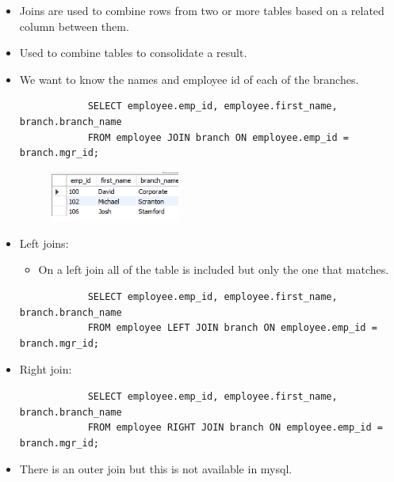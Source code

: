\begin{itemize}
    \item Joins are used to combine rows from two or more tables based on a related column between them.
    \item Used to combine tables to consolidate a result.
    
    \item We want to know the names and employee id of each of the branches.
        \begin{verbatim}
            SELECT employee.emp_id, employee.first_name, branch.branch_name 
            FROM employee JOIN branch ON employee.emp_id = branch.mgr_id;
        \end{verbatim}
        \begin{figure}[H]
            \centering
            \includegraphics[width=0.4\textwidth]{./figs/JOINS.png}
        \end{figure}
    
    \item Left joins:
        \begin{itemize}
            \item On a left join all of the table is included but only the one that matches.
        \end{itemize}
        \begin{verbatim}
            SELECT employee.emp_id, employee.first_name, branch.branch_name 
            FROM employee LEFT JOIN branch ON employee.emp_id = branch.mgr_id;
        \end{verbatim}
    
    \item Right join:
        \begin{verbatim}
            SELECT employee.emp_id, employee.first_name, branch.branch_name 
            FROM employee RIGHT JOIN branch ON employee.emp_id = branch.mgr_id;
        \end{verbatim}
    
    \item There is an outer join but this is not available in mysql.
\end{itemize}

